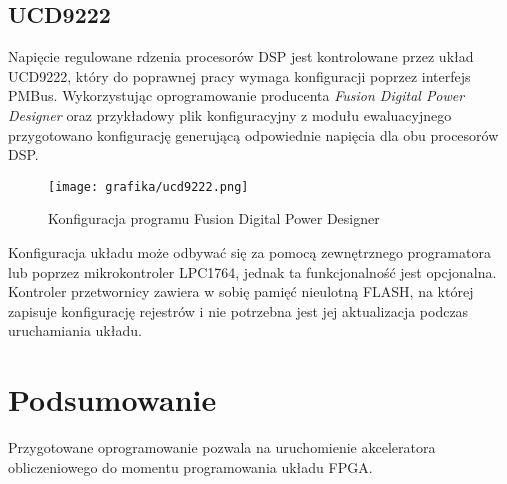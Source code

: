 

\subsection{UCD9222}

Napięcie regulowane rdzenia procesorów DSP jest kontrolowane przez układ UCD9222, który do poprawnej pracy wymaga konfiguracji poprzez interfejs PMBus. Wykorzystując oprogramowanie producenta \textit{Fusion Digital Power Designer} \cite{FUSION} oraz przykładowy plik konfiguracyjny z modułu ewaluacyjnego \cite{UCD9222_EVM} przygotowano konfigurację generującą odpowiednie napięcia dla obu procesorów DSP. 

 \begin{figure}[!ht]
\centering
\texttt{[image: grafika/ucd9222.png]}
\caption{Konfiguracja programu Fusion Digital Power Designer}
\end{figure}

Konfiguracja układu może odbywać się za pomocą zewnętrznego programatora lub poprzez mikrokontroler LPC1764, jednak ta funkcjonalność jest opcjonalna. Kontroler przetwornicy zawiera w sobię pamięć nieulotną FLASH, na której zapisuje konfigurację rejestrów i nie potrzebna jest jej aktualizacja podczas uruchamiania układu. 

\section{Podsumowanie}

Przygotowane oprogramowanie pozwala na uruchomienie akceleratora obliczeniowego do momentu programowania układu FPGA.  


%